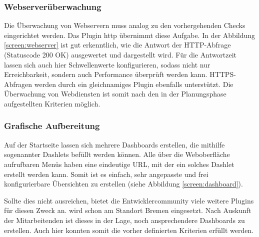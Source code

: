 \subsubsection{Webserverüberwachung}
\label{sec:ÜberwachungWebserver}
Die Überwachung von Webservern muss analog zu den vorhergehenden Checks eingerichtet werden. Das Plugin \glqq{}http\grqq{} übernimmt diese Aufgabe.  In der Abbildung \ref{screen:webserver} ist gut erkenntlich, wie die Antwort der HTTP-Abfrage (Statuscode 200 OK) ausgewertet und dargestellt wird. Für die Antwortzeit lassen sich auch hier Schwellenwerte konfigurieren, sodass nicht nur Erreichbarkeit, sondern auch Performance überprüft werden kann. HTTPS-Abfragen werden durch ein gleichnamiges Plugin ebenfalls unterstützt. Die Überwachung von Webdiensten ist somit nach den in der Planungsphase aufgestellten Kriterien möglich.

\subsubsection{Grafische Aufbereitung}
\label{sec:GrafischeAufbereitung}
Auf der Startseite lassen sich mehrere Dashboards erstellen, die mithilfe sogenannter \glqq{}Dashlets\grqq{} befüllt werden können. Alle über die Weboberfläche aufrufbaren Menüs haben eine eindeutige URL, mit der ein solches Dashlet erstellt werden kann. Somit ist es einfach, sehr angepasste  und frei konfigurierbare Übersichten zu erstellen (siehe Abbildung \ref{screen:dashboard}).

Sollte dies nicht ausreichen, bietet die Entwicklercommunity viele weitere Plugins für diesen Zweck an.  wird schon am Standort Bremen eingesetzt. Nach Auskunft der Mitarbeitenden ist dieses in der Lage, noch ansprechendere Dashboards zu erstellen. Auch hier konnten somit die vorher definierten Kriterien erfüllt werden.
